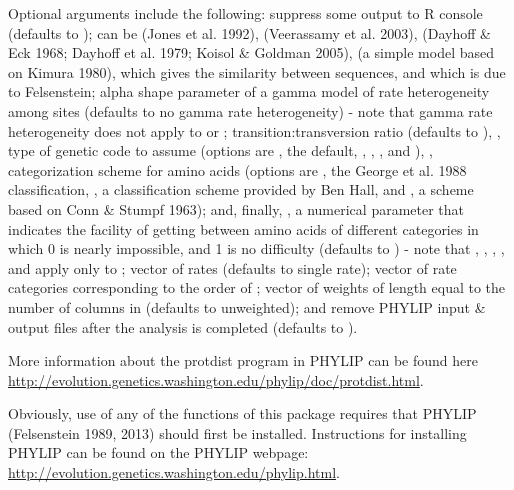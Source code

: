 \documentclass[a4paper]{book}
\begin{document}
\begin{Details}\relax
Optional arguments include the following:  suppress some output to R console (defaults to );  can be  (Jones et al. 1992),  (Veerassamy et al. 2003),  (Dayhoff \& Eck 1968; Dayhoff et al. 1979; Koisol \& Goldman 2005),  (a simple model based on Kimura 1980),  which gives the similarity between sequences, and  which is due to Felsenstein;  alpha shape parameter of a gamma model of rate heterogeneity among sites (defaults to no gamma rate heterogeneity) - note that gamma rate heterogeneity does not apply to  or ;  transition:transversion ratio (defaults to ), , type of genetic code to assume (options are , the default, , , , and ), , categorization scheme for amino acids (options are , the George et al. 1988 classification, , a classification scheme provided by Ben Hall, and , a scheme based on Conn \& Stumpf 1963); and, finally, , a numerical parameter that indicates the facility of getting between amino acids of different categories in which 0 is nearly impossible, and 1 is no difficulty (defaults to ) - note that , , , , and  apply only to ;  vector of rates (defaults to single rate);  vector of rate categories corresponding to the order of ;  vector of weights of length equal to the number of columns in  (defaults to unweighted); and  remove PHYLIP input \& output files after the analysis is completed (defaults to ).

More information about the protdist program in PHYLIP can be found here \url{http://evolution.genetics.washington.edu/phylip/doc/protdist.html}.

Obviously, use of any of the functions of this package requires that PHYLIP (Felsenstein 1989, 2013) should first be installed. Instructions for installing PHYLIP can be found on the PHYLIP webpage: \url{http://evolution.genetics.washington.edu/phylip.html}.
\end{Details}
\end{document}
